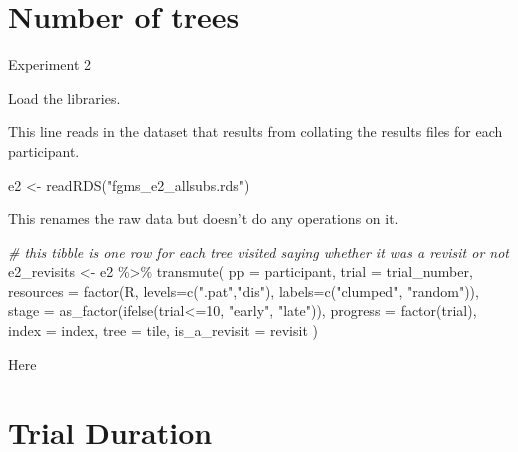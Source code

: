 \documentclass[
]{book}
\newenvironment{Shaded}{\begin{snugshade}}{\end{snugshade}}
\newcommand{\AttributeTok}[1]{\textcolor[rgb]{0.77,0.63,0.00}{#1}}
\newcommand{\CommentTok}[1]{\textcolor[rgb]{0.56,0.35,0.01}{\textit{#1}}}
\newcommand{\DecValTok}[1]{\textcolor[rgb]{0.00,0.00,0.81}{#1}}
\newcommand{\FunctionTok}[1]{\textcolor[rgb]{0.00,0.00,0.00}{#1}}
\newcommand{\NormalTok}[1]{#1}
\newcommand{\OtherTok}[1]{\textcolor[rgb]{0.56,0.35,0.01}{#1}}
\newcommand{\SpecialCharTok}[1]{\textcolor[rgb]{0.00,0.00,0.00}{#1}}
\newcommand{\StringTok}[1]{\textcolor[rgb]{0.31,0.60,0.02}{#1}}
\begin{document}
\hypertarget{number-of-trees-1}{%
\chapter{Number of trees}\label{number-of-trees-1}}

Experiment 2

Load the libraries.

This line reads in the dataset that results from collating the results files for each participant.

\begin{Shaded}
\begin{Highlighting}[]
\NormalTok{e2 }\OtherTok{\textless{}{-}} \FunctionTok{readRDS}\NormalTok{(}\StringTok{"fgms\_e2\_allsubs.rds"}\NormalTok{)}
\end{Highlighting}
\end{Shaded}

This renames the raw data but doesn't do any operations on it.

\begin{Shaded}
\begin{Highlighting}[]
\CommentTok{\# this tibble is one row for each tree visited saying whether it was a revisit or not}
\NormalTok{e2\_revisits }\OtherTok{\textless{}{-}}
\NormalTok{  e2 }\SpecialCharTok{\%\textgreater{}\%}
  \FunctionTok{transmute}\NormalTok{(}
    \AttributeTok{pp           =}\NormalTok{ participant,}
    \AttributeTok{trial        =}\NormalTok{ trial\_number,}
    \AttributeTok{resources    =} \FunctionTok{factor}\NormalTok{(R, }\AttributeTok{levels=}\FunctionTok{c}\NormalTok{(}\StringTok{".pat"}\NormalTok{,}\StringTok{"dis"}\NormalTok{), }\AttributeTok{labels=}\FunctionTok{c}\NormalTok{(}\StringTok{"clumped"}\NormalTok{, }\StringTok{"random"}\NormalTok{)),}
    \AttributeTok{stage        =} \FunctionTok{as\_factor}\NormalTok{(}\FunctionTok{ifelse}\NormalTok{(trial}\SpecialCharTok{\textless{}=}\DecValTok{10}\NormalTok{, }\StringTok{"early"}\NormalTok{, }\StringTok{"late"}\NormalTok{)),}
    \AttributeTok{progress     =} \FunctionTok{factor}\NormalTok{(trial),}
    \AttributeTok{index        =}\NormalTok{ index,}
    \AttributeTok{tree         =}\NormalTok{ tile,}
    \AttributeTok{is\_a\_revisit =}\NormalTok{ revisit}
\NormalTok{  )}
\end{Highlighting}
\end{Shaded}

Here

\hypertarget{trial-duration-1}{%
\chapter{Trial Duration}\label{trial-duration-1}}
\end{document}
